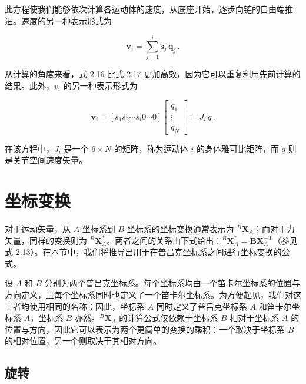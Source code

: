 \documentclass[10pt,a4paper]{book}
\theoremstyle{thmstyle} %
\theoremstyle{defstyle} %
\theoremstyle{prostyle} %
\begin{document}
此方程使我们能够依次计算各运动体的速度，从底座开始，逐步向链的自由端推进。速度的另一种表示形式为



$$
{ \boldsymbol { v } } _ { i } = \sum _ { j = 1 } ^{i} { \boldsymbol { s } } _ { j } \, { \dot { \boldsymbol { q } } } _ { j } \, .
$$



从计算的角度来看，式 2.16 比式 2.17 更加高效，因为它可以重复利用先前计算的结果。此外，$v_{i}$ 的另一种表示形式为



$$
\boldsymbol{ v } _ { i } = \left[ s _ { 1 }  s _ { 2 }  \cdots  s _ { i }  0  \cdots  0 \right] \left[ \begin{array}{l} { \dot { q } _ { 1 } } \\{ \vdots } \\{ \dot { q } _ { N } } \end{array} \right] = J _ { i } \, \dot { q } \, .
$$



在该方程中，$J_{i}$ 是一个 $6 \times N$ 的矩阵，称为运动体 $i$ 的身体雅可比矩阵，而 $\dot{q}$ 则是关节空间速度矢量。



\section{坐标变换}





对于运动矢量，从 $A$ 坐标系到 $B$ 坐标系的坐标变换通常表示为 ${}^{B}\mathbf{X}_{A}$；而对于力矢量，同样的变换则为 ${}^{B}\mathbf{X}_{A}^{*}$。两者之间的关系由下式给出：${}^{B}\mathbf{X}_{A}^{*}=\mathbf{B}\mathbf{X}_{A}^{-\mathrm{T}}$（参见式 2.13）。在本节中，我们将推导出用于在普吕克坐标系之间进行坐标变换的公式。



设 $A$ 和 $B$ 分别为两个普吕克坐标系。每个坐标系均由一个笛卡尔坐标系的位置与方向定义，且每个坐标系同时也定义了一个笛卡尔坐标系。为方便起见，我们对这三者均使用相同的名称；因此，坐标系 $A$ 同时定义了普吕克坐标系 $A$ 和笛卡尔坐标系 $A$，坐标系 $B$ 亦然。${}^{B}\mathbf{X}_{A}$ 的计算公式仅依赖于坐标系 $B$ 相对于坐标系 $A$ 的位置与方向，因此它可以表示为两个更简单的变换的乘积：一个取决于坐标系 $B$ 的相对位置，另一个则取决于其相对方向。



\subsection{旋转}
\end{document}
